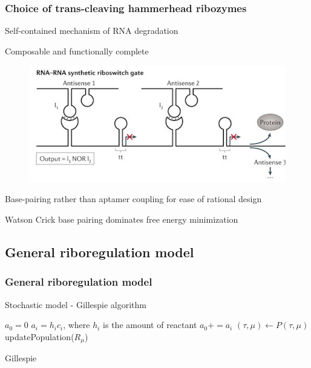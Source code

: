 \documentclass{beamer}
\begin{document}
\begin{frame}
\frametitle{Choice of trans-cleaving  hammerhead ribozymes}

Self-contained mechanism of RNA degradation

Composable and functionally complete 

\begin{figure}
  \includegraphics[scale=0.25]{functional.png}
\end{figure}

Base-pairing rather than aptamer coupling for 
ease of rational design

Watson Crick base pairing dominates free energy minimization
\end{frame}


\subsection{General riboregulation model}
\begin{frame}
\frametitle{General riboregulation model}

Stochastic model - Gillespie algorithm


\begin{algorithm}[H]
\begin{algorithmic}[1]
  \STATE $a_{0} = 0$
  \STATE $a_{i} = h_ic_i$, where $h_i$ is the amount of reactant
  \STATE $a_0 += a_{i}$
  \ENDFOR
  \STATE $(\tau,\mu) \leftarrow P(\tau,\mu)$
  \STATE updatePopulation($R_{\mu}$)
  \ENDWHILE
\end{algorithmic}
\caption{Gillespie}
\end{algorithm}

\end{frame}
\end{document}
